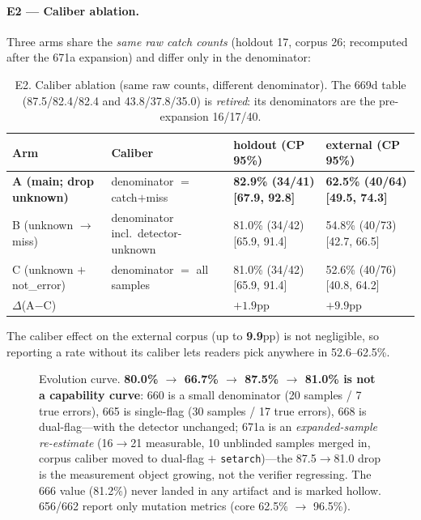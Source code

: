 \documentclass{article}
\begin{document}
\paragraph{E2 --- Caliber ablation.} Three arms share the \emph{same raw catch counts}
(holdout 17, corpus 26; recomputed after the 671a expansion) and differ only in the denominator:
\begin{table}[t]
\caption{E2. Caliber ablation (same raw counts, different denominator). The 669d table
(87.5/82.4/82.4 and 43.8/37.8/35.0) is \emph{retired}: its denominators are the pre-expansion
16/17/40.}
\label{tab:e2}
\centering
\footnotesize
\begin{tabular}{@{}lp{3.6cm}p{3.6cm}p{3.6cm}@{}}
\toprule
Arm & Caliber & holdout (CP 95\%) & external (CP 95\%) \\
\midrule
\textbf{A (main; drop unknown)} & denominator $=$ catch$+$miss & \textbf{82.9\% (34/41) [67.9, 92.8]} & \textbf{62.5\% (40/64) [49.5, 74.3]} \\
B (unknown $\to$ miss) & denominator incl.\ detector-unknown & 81.0\% (34/42) [65.9, 91.4] & 54.8\% (40/73) [42.7, 66.5] \\
C (unknown $+$ not\_error) & denominator $=$ all samples & 81.0\% (34/42) [65.9, 91.4] & 52.6\% (40/76) [40.8, 64.2] \\
\midrule
$\Delta$(A$-$C) & & $+1.9$pp & $\mathbf{+9.9}$pp \\
\bottomrule
\end{tabular}
\end{table}
The caliber effect on the external corpus (up to \textbf{9.9}pp) is not negligible, so reporting
a rate without its caliber lets readers pick anywhere in 52.6--62.5\%.

\begin{figure}[t]
\centering
{}
\caption{Evolution curve. \textbf{80.0\% $\to$ 66.7\% $\to$ 87.5\% $\to$ 81.0\% is not a
capability curve}: 660 is a small denominator (20 samples / 7 true errors), 665 is single-flag
(30 samples / 17 true errors), 668 is dual-flag---with the detector unchanged; 671a is an
\emph{expanded-sample re-estimate} (16$\to$21 measurable, 10 unblinded samples merged in, corpus
caliber moved to dual-flag $+$ \texttt{setarch})---the 87.5$\to$81.0 drop is the measurement
object growing, not the verifier regressing. The 666 value (81.2\%) never landed in
any artifact and is marked hollow. 656/662 report only mutation metrics (core 62.5\% $\to$ 96.5\%).}
\label{fig:evolution}
\end{figure}
\end{document}
